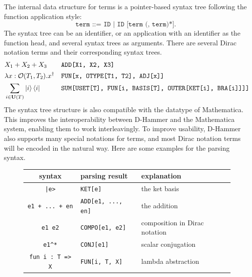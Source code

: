 The internal data structure for terms is a pointer-based syntax tree following the function application style:
\[
    \texttt{
        term ::= ID | ID [term (, term)*].
    }
\]
The syntax tree can be an identifier, or an application with an identifier as the function head, and several syntax trees as arguments. There are several Dirac notation terms and their corresponding syntax trees.
\footnotesize{
\begin{align*}
    & X_1 + X_2 + X_3 && \texttt{ADD[X1, X2, X3]} 
    \\
    & \lambda x: \mathcal{O}(T_1,  T_2). x^\dagger && \texttt{FUN[x, OTYPE[T1, T2], ADJ[x]]}
    \\
    & \sum_{i \in \mathbf{U}(T)} \ket{i} \bra{i} && \texttt{SUM[USET[T], FUN[i, BASIS[T], OUTER[KET[i], BRA[i]]]]}
\end{align*}
}
The syntax tree structure is also compatible with the datatype of Mathematica. This improves the interoperability between D-Hammer and the Mathematica system, enabling them to work interleavingly.
To improve usability, D-Hammer also supports many special notations for terms,  and most Dirac notation terms will be encoded in the natural way.
Here are some examples for the parsing syntax.

\begin{figure}
    \center
\begin{tabular}{c >{\centering\arraybackslash}p{4cm} l}
    \hline
    syntax & parsing result & explanation \\
    \hline
    \texttt{|e>} & \texttt{KET[e]} & the ket basis\\
    \texttt{e1 + ... + en} & \texttt{ADD[e1, ..., en]} & the addition\\
    \texttt{e1\ e2} & \texttt{COMPO[e1, e2]} & composition in Dirac notation \\
    \texttt{e1\^{}*} & \texttt{CONJ[e1]} & scalar conjugation \\
    \texttt{fun i : T => X} & \texttt{FUN[i, T, X]} & lambda abstraction \\
    \hline
\end{tabular}
\end{figure}

